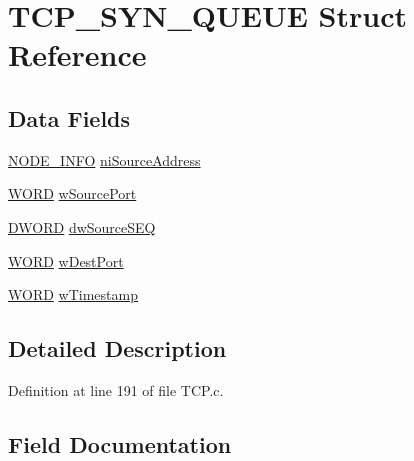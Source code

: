 \hypertarget{struct_t_c_p___s_y_n___q_u_e_u_e}{}\section{T\+C\+P\+\_\+\+S\+Y\+N\+\_\+\+Q\+U\+E\+U\+E Struct Reference}
\label{struct_t_c_p___s_y_n___q_u_e_u_e}
\subsection*{Data Fields}
\begin{DoxyCompactItemize}
\item 
\hyperlink{_stack_tsk_8h_ac28a7d4076195ab8e3376f06055f8ee4}{N\+O\+D\+E\+\_\+\+I\+N\+F\+O} \hyperlink{struct_t_c_p___s_y_n___q_u_e_u_e_a86fb1c2f41cbd3136de2afa6497925f2}{ni\+Source\+Address}
\item 
\hyperlink{_generic_type_defs_8h_a2b0e863dadf920709ec53d9088ee7c91}{W\+O\+R\+D} \hyperlink{struct_t_c_p___s_y_n___q_u_e_u_e_ad129842efc936a38e329384496850daf}{w\+Source\+Port}
\item 
\hyperlink{_generic_type_defs_8h_ad342ac907eb044443153a22f964bf0af}{D\+W\+O\+R\+D} \hyperlink{struct_t_c_p___s_y_n___q_u_e_u_e_ab040df9bb3ca4da90ebc0b1b59a6a618}{dw\+Source\+S\+E\+Q}
\item 
\hyperlink{_generic_type_defs_8h_a2b0e863dadf920709ec53d9088ee7c91}{W\+O\+R\+D} \hyperlink{struct_t_c_p___s_y_n___q_u_e_u_e_a4a73e1502cba148db181af196cdf145a}{w\+Dest\+Port}
\item 
\hyperlink{_generic_type_defs_8h_a2b0e863dadf920709ec53d9088ee7c91}{W\+O\+R\+D} \hyperlink{struct_t_c_p___s_y_n___q_u_e_u_e_a0aa09af9f70a0f4959f9d8949c04df35}{w\+Timestamp}
\end{DoxyCompactItemize}


\subsection{Detailed Description}


Definition at line 191 of file T\+C\+P.\+c.



\subsection{Field Documentation}
\hypertarget{struct_t_c_p___s_y_n___q_u_e_u_e_ab040df9bb3ca4da90ebc0b1b59a6a618}{}

